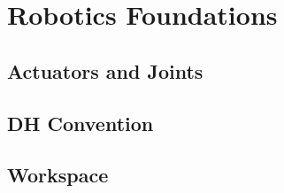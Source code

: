 \chapter{Robotics Foundations}

\section{Actuators and Joints}

\section{DH Convention}

\section{Workspace}